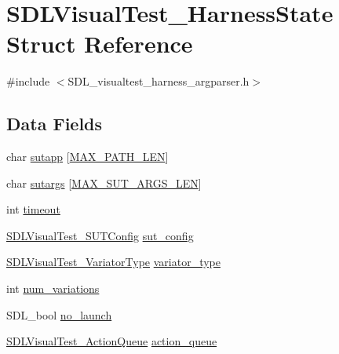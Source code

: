 \hypertarget{struct_s_d_l_visual_test___harness_state}{\section{S\-D\-L\-Visual\-Test\-\_\-\-Harness\-State Struct Reference}
\label{struct_s_d_l_visual_test___harness_state}
}


{\ttfamily \#include $<$S\-D\-L\-\_\-visualtest\-\_\-harness\-\_\-argparser.\-h$>$}

\subsection*{Data Fields}
\begin{DoxyCompactItemize}
\item 
char \hyperlink{struct_s_d_l_visual_test___harness_state_af277bbb5c712eb89e92337dd583a8b74}{sutapp} \mbox{[}\hyperlink{_s_d_l__visualtest__harness__argparser_8h_abdd33f362ae3bbdacb5de76473aa8a2f}{M\-A\-X\-\_\-\-P\-A\-T\-H\-\_\-\-L\-E\-N}\mbox{]}
\item 
char \hyperlink{struct_s_d_l_visual_test___harness_state_a00fab9c7cf802b96b6b29e098292d24d}{sutargs} \mbox{[}\hyperlink{_s_d_l__visualtest__harness__argparser_8h_a8485cbda108eca56406d67aaa685fcc5}{M\-A\-X\-\_\-\-S\-U\-T\-\_\-\-A\-R\-G\-S\-\_\-\-L\-E\-N}\mbox{]}
\item 
int \hyperlink{struct_s_d_l_visual_test___harness_state_a493b57f443cc38b3d3df9c1e584d9d82}{timeout}
\item 
\hyperlink{struct_s_d_l_visual_test___s_u_t_config}{S\-D\-L\-Visual\-Test\-\_\-\-S\-U\-T\-Config} \hyperlink{struct_s_d_l_visual_test___harness_state_a42657080015a96da836e1640bbdf870e}{sut\-\_\-config}
\item 
\hyperlink{_s_d_l__visualtest__variator__common_8h_a04bfc880abe6940d69a63c06a33acdbd}{S\-D\-L\-Visual\-Test\-\_\-\-Variator\-Type} \hyperlink{struct_s_d_l_visual_test___harness_state_aaaa989ae89caee6d39c722cfe6907466}{variator\-\_\-type}
\item 
int \hyperlink{struct_s_d_l_visual_test___harness_state_a0bd4e04c0c6be7b94e68501bb31dd62c}{num\-\_\-variations}
\item 
S\-D\-L\-\_\-bool \hyperlink{struct_s_d_l_visual_test___harness_state_a091c0d08290b73216a736ff42ac8fa99}{no\-\_\-launch}
\item 
\hyperlink{struct_s_d_l_visual_test___action_queue}{S\-D\-L\-Visual\-Test\-\_\-\-Action\-Queue} \hyperlink{struct_s_d_l_visual_test___harness_state_ae25567527563fbd7373fa1cf7cdede61}{action\-\_\-queue}

\end{DoxyCompactItemize}
